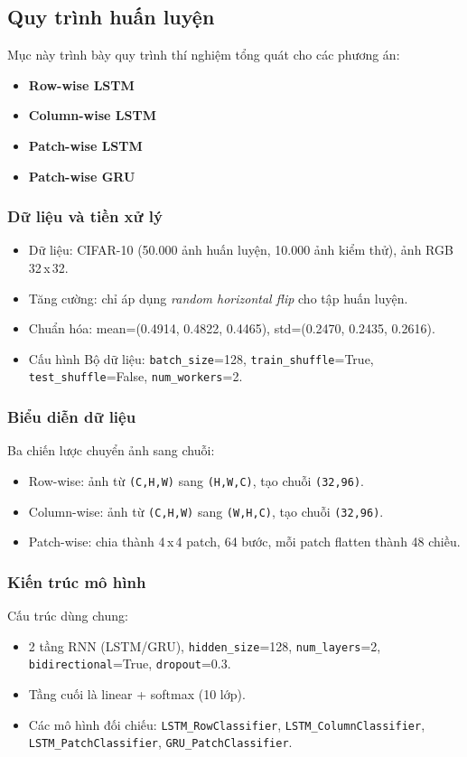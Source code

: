 \documentclass[12pt,a4paper]{article}
\numberwithin{figure}{section}
\numberwithin{table}{section}
\begin{document}
\subsection{Quy trình huấn luyện}
Mục này trình bày quy trình thí nghiệm tổng quát cho các phương án:
\begin{itemize}
    \item \textbf{Row-wise LSTM}
    \item \textbf{Column-wise LSTM}
    \item \textbf{Patch-wise LSTM}
    \item \textbf{Patch-wise GRU}
\end{itemize}

\subsubsection{Dữ liệu và tiền xử lý}
\begin{itemize}
    \item Dữ liệu: CIFAR-10 (50.000 ảnh huấn luyện, 10.000 ảnh kiểm thử), ảnh RGB 32\,x\,32.
    \item Tăng cường: chỉ áp dụng \textit{random horizontal flip} cho tập huấn luyện.
    \item Chuẩn hóa: mean=(0.4914, 0.4822, 0.4465), std=(0.2470, 0.2435, 0.2616).
    \item Cấu hình Bộ dữ liệu: \texttt{batch\_size}=128, \texttt{train\_shuffle}=True, \texttt{test\_shuffle}=False, \texttt{num\_workers}=2.
\end{itemize}

\subsubsection{Biểu diễn dữ liệu}
Ba chiến lược chuyển ảnh sang chuỗi:
\begin{itemize}
    \item Row-wise: ảnh từ \texttt{(C,H,W)} sang \texttt{(H,W,C)}, tạo chuỗi \texttt{(32,96)}.
    \item Column-wise: ảnh từ \texttt{(C,H,W)} sang \texttt{(W,H,C)}, tạo chuỗi \texttt{(32,96)}.
    \item Patch-wise: chia thành 4\,x\,4 patch, 64 bước, mỗi patch flatten thành 48 chiều.
\end{itemize}

\subsubsection{Kiến trúc mô hình}
Cấu trúc dùng chung:
\begin{itemize}
    \item 2 tầng RNN (LSTM/GRU), \texttt{hidden\_size}=128, \texttt{num\_layers}=2, \texttt{bidirectional}=True, \texttt{dropout}=0.3.
    \item Tầng cuối là linear + softmax (10 lớp).
    \item Các mô hình đối chiếu: \texttt{LSTM\_RowClassifier}, \texttt{LSTM\_ColumnClassifier}, \texttt{LSTM\_PatchClassifier}, \texttt{GRU\_PatchClassifier}.
\end{itemize}
\end{document}
